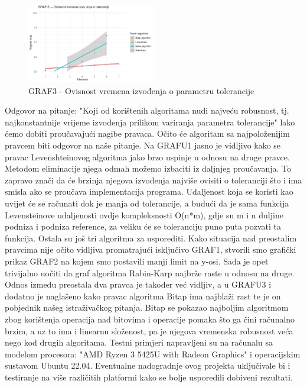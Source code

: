 \documentclass[conference]{IEEEtran}
\begin{document}
\begin{figure}[htbp]
\centerline{\includegraphics[width=0.5\textwidth]{Grafovi_i_csv_datoteke/GRAF3.png}}
\caption{GRAF3 - Ovisnost vremena izvođenja o parametru tolerancije}
\label{fig}
\end{figure}
\newpage
Odgovor na pitanje: "Koji od korištenih algoritama nudi najveću robusnost, tj. najkonstantnije vrijeme izvođenja prilikom variranja parametra tolerancije" lako ćemo dobiti proučavajući nagibe pravaca. Očito će algoritam sa najpoloženijim pravcem biti odgovor na naše pitanje. 
Na GRAFU1 jasno je vidljivo kako se pravac Levenshteinovog algoritma jako brzo uspinje u odnosu na druge pravce. Metodom eliminacije njega odmah možemo izbaciti iz daljnjeg proučavanja.
To zapravo znači da će brzinja njegova izvođenja najviše ovisiti o toleranciji što i ima smisla ako se proučava implementacija programa. Udaljenost koja se koristi kao uvijet će se računati dok je manja od tolerancije, a budući da je sama funkcija Levensteinove udaljenosti ovdje kompleksnosti O(n*m), gdje su m i n duljine podniza i podniza reference, za veliku će se toleranciju puno puta pozvati ta funkcija. Ostala su još tri algoritma za usporediti.
Kako situacija nad preostalim pravcima nije očito vidljiva promatrajući isključivo GRAF1, stvorili smo grafički prikaz GRAF2 na kojem smo postavili manji limit na y-osi. Sada je opet trivijalno uočiti da graf algoritma Rabin-Karp najbrže raste u odnosu na druge.
Odnos između preostala dva pravca je također već vidljiv, a u GRAFU3 i dodatno je naglašeno kako pravac algoritma Bitap ima najblaži rast te je on pobjednik našeg istraživačkog pitanja. 
Bitap se pokazao najboljim algoritmom zbog korištenja operacija nad bitovima i operacije pomaka što ga čini računalno brzim, a uz to ima i linearnu složenost, pa je njegova vremenska robusnost veća nego kod drugih algoritama.
Testni primjeri napravljeni su na računalu sa modelom procesora: "AMD Ryzen 3 5425U with Radeon Graphics" i operacijskim sustavom Ubuntu 22.04. Eventualne nadogradnje ovog projekta uključivale bi i testiranje na više različitih platformi kako se bolje usporedili dobiveni rezultati.
\end{document}
